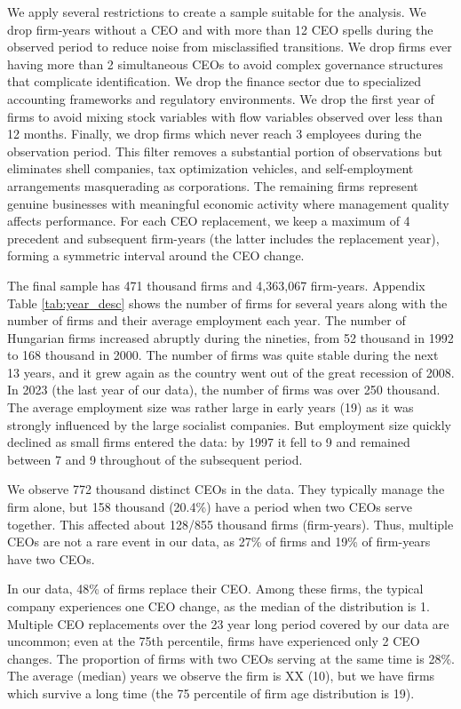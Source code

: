 \documentclass[sigconf,nonacm]{acmart}
\begin{document}
We apply several restrictions to create a sample suitable for the analysis. We drop firm-years without a CEO and with more than 12 CEO spells during the observed period to reduce noise from misclassified transitions. We drop firms ever having more than 2 simultaneous CEOs to avoid complex governance structures that complicate identification. We drop the finance sector due to specialized accounting frameworks and regulatory environments. We drop the first year of firms to avoid mixing stock variables with flow variables observed over less than 12 months. Finally, we drop firms which never reach 3 employees during the observation period. This filter removes a substantial portion of observations but eliminates shell companies, tax optimization vehicles, and self-employment arrangements masquerading as corporations. The remaining firms represent genuine businesses with meaningful economic activity where management quality affects performance. For each CEO replacement, we keep a maximum of 4 precedent and subsequent firm-years (the latter includes the replacement year), forming a symmetric interval around the CEO change.

The final sample has 471 thousand firms and 4,363,067 firm-years. Appendix Table \ref{tab:year_desc} shows the number of firms for several years along with the number of firms and their average employment each year. The number of Hungarian firms increased abruptly during the nineties, from 52 thousand in 1992 to 168 thousand in 2000. The number of firms was quite stable during the next 13 years, and it grew again as the country went out of the great recession of 2008. In 2023 (the last year of our data), the number of firms was over 250 thousand. The average employment size was rather large in early years (19) as it was strongly influenced by the large socialist companies. But employment size quickly declined as small firms entered the data: by 1997 it fell to 9 and remained between 7 and 9 throughout of the subsequent period.

We observe 772 thousand distinct CEOs in the data. They typically manage the firm alone, but 158 thousand (20.4\%) have a period when two CEOs serve together. This affected about 128/855 thousand firms (firm-years). Thus, multiple CEOs are not a rare event in our data, as 27\% of firms and 19\% of firm-years have two CEOs.

In our data, 48\% of firms replace their CEO. Among these firms, the typical company experiences one CEO change, as the median of the distribution is 1. Multiple CEO replacements over the 23 year long period covered by our data are uncommon; even at the 75th percentile, firms have experienced only 2 CEO changes. The proportion of firms with two CEOs serving at the same time is 28\%. The average (median) years we observe the firm is XX (10), but we have firms which survive a long time (the 75 percentile of firm age distribution is 19).
\end{document}
